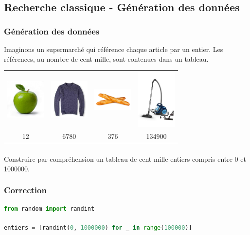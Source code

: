 \documentclass[svgnames,11pt]{beamer}
\begin{document}
\subsection{Recherche classique - Génération des données}
\begin{frame}
    \frametitle{Génération des données}
    Imaginons un supermarché qui référence chaque article par un entier. Les références, au nombre de cent mille, sont contenues dans un tableau.

\begin{center}
    \begin{tabular}{*{4}{c}}
        \includegraphics[width=2cm]{ressources/pomme.jpg}&
        \includegraphics[width=2cm]{ressources/pull.jpg}&
        \includegraphics[width=2cm]{ressources/pain.jpg}&
        \includegraphics[width=2cm]{ressources/aspirateur.jpg}\\
        12&6780&376&134900\\
    \end{tabular}
\end{center}
\end{frame}
\begin{frame}
    \frametitle{}

    \begin{activite}
        Construire par compréhension un tableau de cent mille entiers compris entre 0 et 1000000.
    \end{activite}

\end{frame}
\begin{frame}[fragile]
    \frametitle{Correction}

    \begin{center}
    \begin{lstlisting}[language=Python , basicstyle=\ttfamily\small, xleftmargin=0.2em, xrightmargin=-1em]
from random import randint

entiers = [randint(0, 1000000) for _ in range(100000)]
\end{lstlisting}
    \label{CODE}
    \end{center}

\end{frame}
\end{document}

